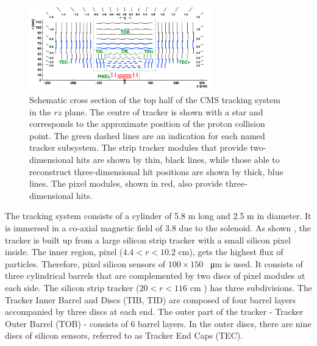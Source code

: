 \begin{figure}[ht]
	\centering
	\includegraphics[width=0.7\textwidth]{2_ExperimentalSetup/Figures/imageedit_11_9317262269}
  \caption{Schematic cross section of the top half of the CMS tracking system in the $rz$ plane. The centre of tracker is shown with a star and corresponds to the approximate position of the proton collision point. The green dashed lines are an indication for each named tracker subsystem. The strip tracker modules that provide two-dimensional hits are shown by thin, black lines, while those able to reconstruct three-dimensional hit positions are shown by thick, blue lines. The pixel modules, shown in red, also provide three-dimensional hits. \cite{Bayatian:2006zz} }
	\label{fig:Tracker}
\end{figure}

 The tracking system consists of a cylinder of 5.8 \si{ \meter} long and 2.5 \si{ \meter} in diameter. It is immersed in a co-axial magnetic field of 3.8 \si{ \Tesla} due to the solenoid.
 As shown , the tracker is built up from a large silicon strip tracker with a small silicon pixel inside. 
 The inner region, pixel ($4.4<r<10.2$ \si{ \cm}), gets the highest flux of particles. Therefore, pixel silicon sensors of $100 \times 150$ \si{ \squared \micro \meter} is used. It consists of three cylindrical barrels that are complemented by two discs of pixel modules at each side.
 The silicon strip tracker ($20<r<116$ \si{ \cm} ) has three subdivisions. The Tracker Inner Barrel  and Discs (TIB, TID) are composed of four barrel layers accompanied by three discs at each end. The outer part of the tracker - Tracker Outer Barrel (TOB) -  consists  of 6 barrel layers. In the outer discs, there are nine discs of silicon sensors, referred to as Tracker End Caps (TEC). 
  
